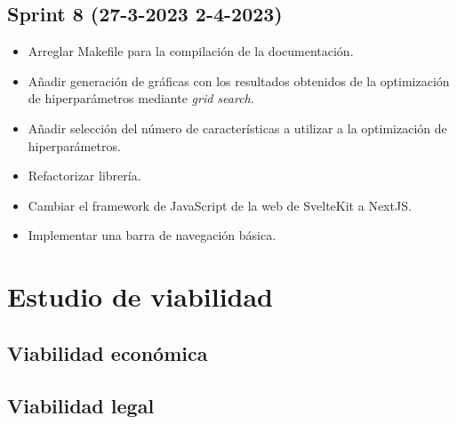 \subsection{Sprint 8 (27-3-2023  2-4-2023)}

\begin{itemize}
    \item Arreglar Makefile para la compilación de la documentación.
    \item Añadir generación de gráficas con los resultados obtenidos de la
          optimización de hiperparámetros mediante \textit{grid search}.
    \item Añadir selección del número de características a utilizar a la
          optimización de hiperparámetros.
    \item Refactorizar librería.
    \item Cambiar el framework de JavaScript de la web de SvelteKit a NextJS.
    \item Implementar una barra de navegación básica.
\end{itemize}


\section{Estudio de viabilidad}

\subsection{Viabilidad económica}

\subsection{Viabilidad legal}
